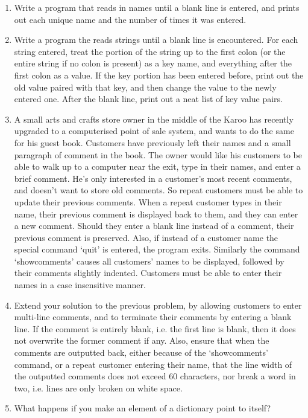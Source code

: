 \begin{enumerate}
\begin{enumerate}
\end{enumerate}
	\item Write a program that reads in names until a blank line is    entered, and prints out each unique name and the number of times    it was entered.
	\item Write a program the reads strings until a blank line is    encountered. For each string entered, treat the portion of the    string up to the first colon (or the entire string if no colon is    present) as a key name, and everything after the first colon as a    value. If the key portion has been entered before, print out the old    value paired with that key, and then change the value to the newly    entered one. After the blank line, print out a neat list of key    value pairs.
	\item A small arts and crafts store owner in the middle of the Karoo    has recently upgraded to a computerised point of sale system, and    wants to do the same for his guest book. Customers have previously    left their names and a small paragraph of comment in the book. The owner    would like his customers to be able to walk up to a computer near    the exit, type in their names, and enter a brief comment. He's only    interested in a customer's most recent comments, and doesn't want    to store old comments. So repeat customers must be able to update    their previous comments. When a repeat customer types in their name,    their previous comment is displayed back to them, and they can       enter a new comment. Should they enter a    blank line instead of a comment, their previous comment is    preserved. Also, if instead of a customer name the special command    `quit' is entered, the program exits. Similarly the command    `showcomments' causes all customers' names to be displayed, followed    by their comments slightly indented. Customers must be able to    enter their names in a case insensitive manner.
	\item Extend your solution to the previous problem, by allowing    customers to enter multi-line comments, and to terminate their    comments by entering a blank line. If the comment is entirely    blank, i.e. the first line is blank, then it does not overwrite the    former comment if any. Also, ensure that when the comments are    outputted back, either because of the `showcomments' command, or a    repeat customer entering their name, that the line width of the    outputted comments does not exceed 60 characters, nor break a word    in two, i.e. lines are only broken on white space.
	\item What happens if you make an element of a dictionary point to    itself?
\end{enumerate}   
